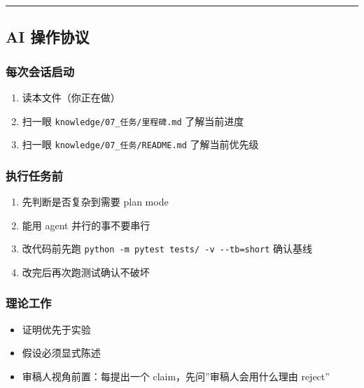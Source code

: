 \documentclass[
  12pt,
]{ctexart}
\providecommand{\tightlist}{%
  \setlength{\itemsep}{0pt}\setlength{\parskip}{0pt}}
\begin{document}
\begin{center}\rule{0.5\linewidth}{0.5pt}\end{center}

\subsection{AI 操作协议}\label{ai-ux64cdux4f5cux534fux8bae}

\subsubsection{每次会话启动}\label{ux6bcfux6b21ux4f1aux8bddux542fux52a8}

\begin{enumerate}
\def\labelenumi{\arabic{enumi}.}
\tightlist
\item
  读本文件（你正在做）
\item
  扫一眼 \texttt{knowledge/07\_任务/里程碑.md} 了解当前进度
\item
  扫一眼 \texttt{knowledge/07\_任务/README.md} 了解当前优先级
\end{enumerate}

\subsubsection{执行任务前}\label{ux6267ux884cux4efbux52a1ux524d}

\begin{enumerate}
\def\labelenumi{\arabic{enumi}.}
\tightlist
\item
  先判断是否复杂到需要 plan mode
\item
  能用 agent 并行的事不要串行
\item
  改代码前先跑 \texttt{python\ -m\ pytest\ tests/\ -v\ -\/-tb=short}
  确认基线
\item
  改完后再次跑测试确认不破坏
\end{enumerate}

\subsubsection{理论工作}\label{ux7406ux8bbaux5de5ux4f5c}

\begin{itemize}
\tightlist
\item
  证明优先于实验
\item
  假设必须显式陈述
\item
  审稿人视角前置：每提出一个 claim，先问''审稿人会用什么理由 reject''
\end{itemize}
\end{document}

